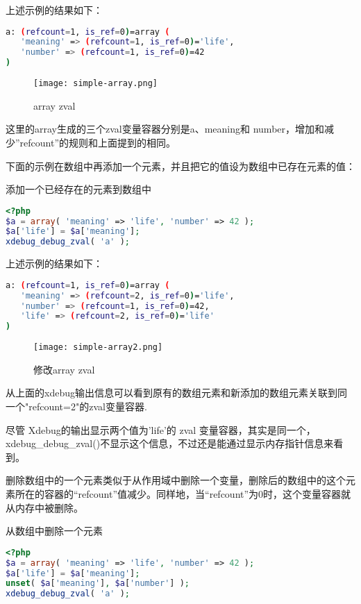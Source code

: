 上述示例的结果如下：

\begin{lstlisting}[language=bash]
a: (refcount=1, is_ref=0)=array (
   'meaning' => (refcount=1, is_ref=0)='life',
   'number' => (refcount=1, is_ref=0)=42
)
\end{lstlisting}

\begin{figure}[htbp]
\centering
\texttt{[image: simple-array.png]}
\caption{array zval}
\end{figure}

这里的array生成的三个zval变量容器分别是a、meaning和 number，增加和减少”refcount”的规则和上面提到的相同。

下面的示例在数组中再添加一个元素，并且把它的值设为数组中已存在元素的值：


\begin{example}
添加一个已经存在的元素到数组中
\begin{lstlisting}[language=PHP]
<?php
$a = array( 'meaning' => 'life', 'number' => 42 );
$a['life'] = $a['meaning'];
xdebug_debug_zval( 'a' );
\end{lstlisting}
\end{example}

上述示例的结果如下：

\begin{lstlisting}[language=bash]
a: (refcount=1, is_ref=0)=array (
   'meaning' => (refcount=2, is_ref=0)='life',
   'number' => (refcount=1, is_ref=0)=42,
   'life' => (refcount=2, is_ref=0)='life'
)
\end{lstlisting}


\begin{figure}[htbp]
\centering
\texttt{[image: simple-array2.png]}
\caption{修改array zval}
\end{figure}

从上面的xdebug输出信息可以看到原有的数组元素和新添加的数组元素关联到同一个"refcount=2"的zval变量容器.

尽管 Xdebug的输出显示两个值为'life'的 zval 变量容器，其实是同一个，xdebug\_debug\_zval()不显示这个信息，不过还是能通过显示内存指针信息来看到。

删除数组中的一个元素类似于从作用域中删除一个变量，删除后的数组中的这个元素所在的容器的“refcount”值减少。同样地，当“refcount”为0时，这个变量容器就从内存中被删除。

\begin{example}
从数组中删除一个元素
\begin{lstlisting}[language=PHP]
<?php
$a = array( 'meaning' => 'life', 'number' => 42 );
$a['life'] = $a['meaning'];
unset( $a['meaning'], $a['number'] );
xdebug_debug_zval( 'a' );
\end{lstlisting}
\end{example}

